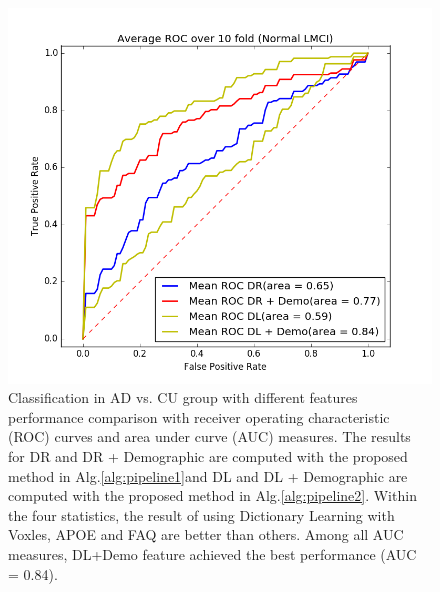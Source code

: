 \begin{figure}[h]
	\centering
	\includegraphics[width=\linewidth]{figures/CU_LMCI}
	\caption[ROC for Normal vs. LMCI]{Classification in AD vs. CU group with different features performance comparison with receiver operating characteristic (ROC) curves and area under curve (AUC) measures. The results for DR and DR + Demographic are computed with the proposed method in Alg.\ref{alg:pipeline1}and DL and DL + Demographic are computed with the proposed method in Alg.\ref{alg:pipeline2}. Within the four statistics, the result of using Dictionary Learning with Voxles, APOE and FAQ are better than others.  Among all AUC measures, DL+Demo feature achieved the best performance (AUC = 0.84).}
	\label{fig:culmci}
\end{figure}
